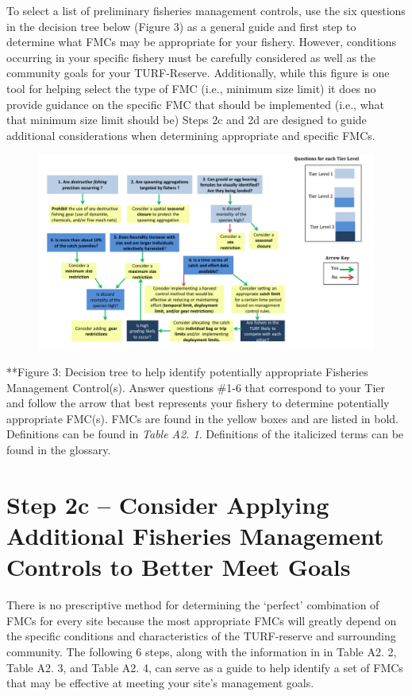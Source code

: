 \documentclass[]{book}
\begin{document}
To select a list of preliminary fisheries management controls, use the
six questions in the decision tree below (Figure 3) as a general guide
and first step to determine what FMCs may be appropriate for your
fishery. However, conditions occurring in your specific fishery must be
carefully considered as well as the community goals for your
TURF-Reserve. Additionally, while this figure is one tool for helping
select the type of FMC (i.e., minimum size limit) it does no provide
guidance on the specific FMC that should be implemented (i.e., what that
minimum size limit should be) Steps 2c and 2d are designed to guide
additional considerations when determining appropriate and specific
FMCs.

\begin{figure}
\centering
\includegraphics{myMediaFolder/media/FMCs.png}
\caption{}
\end{figure}

**Figure 3: Decision tree to help identify potentially appropriate
Fisheries Management Control(s). Answer questions \#1-6 that correspond
to your Tier and follow the arrow that best represents your fishery to
determine potentially appropriate FMC(s). FMCs are found in the yellow
boxes and are listed in bold. Definitions can be found in \emph{Table
A2. 1}. Definitions of the italicized terms can be found in the
glossary.

\section{Step 2c -- Consider Applying Additional Fisheries Management
Controls to Better Meet
Goals}\label{step-2c-consider-applying-additional-fisheries-management-controls-to-better-meet-goals}

There is no prescriptive method for determining the `perfect'
combination of FMCs for every site because the most appropriate FMCs
will greatly depend on the specific conditions and characteristics of
the TURF-reserve and surrounding community. The following 6 steps, along
with the information in in Table A2. 2, Table A2. 3, and Table A2. 4,
can serve as a guide to help identify a set of FMCs that may be
effective at meeting your site's management goals.
\end{document}
